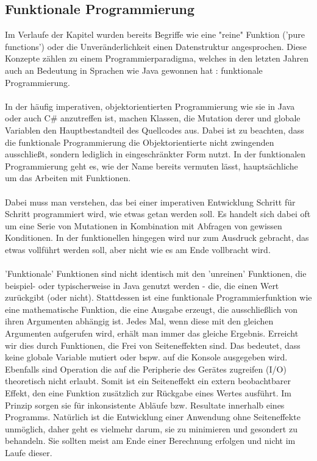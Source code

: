 \subsection{Funktionale Programmierung}
Im Verlaufe der Kapitel wurden bereits Begriffe wie eine "reine" Funktion ('pure functions') oder die Unveränderlichkeit einen Datenstruktur angesprochen. Diese Konzepte zählen zu einem Programmierparadigma, welches in den letzten Jahren auch an Bedeutung in Sprachen wie Java gewonnen hat
\cite{javaFunctionalProgramming}
: funktionale Programmierung.
\\\\
In der häufig imperativen, objektorientierten Programmierung wie sie in Java oder auch C\# anzutreffen ist, machen Klassen, die Mutation derer und globale Variablen den Hauptbestandteil des Quellcodes aus. Dabei ist zu beachten, dass die funktionale Programmierung die Objektorientierte nicht zwingenden ausschließt, sondern lediglich in eingeschränkter Form nutzt. In der funktionalen Programmierung geht es, wie der Name bereits vermuten lässt, hauptsächliche um das Arbeiten mit Funktionen.
\\\\ 
Dabei muss man verstehen, das bei einer imperativen Entwicklung Schritt für Schritt programmiert wird, wie etwas getan werden soll. Es handelt sich dabei oft um eine Serie von Mutationen in Kombination mit Abfragen von gewissen Konditionen. In der funktionellen hingegen wird nur zum Ausdruck gebracht, das etwas vollführt werden soll, aber nicht wie es am Ende vollbracht wird. 
\\\\
'Funktionale' Funktionen sind nicht identisch mit den 'unreinen' Funktionen, die beispiel- oder typischerweise in Java genutzt werden - die, die einen Wert zurückgibt (oder nicht). Stattdessen ist eine funktionale Programmierfunktion wie eine mathematische Funktion, die eine Ausgabe erzeugt, die ausschließlich von ihren Argumenten abhängig ist. Jedes Mal, wenn diese mit den gleichen Argumenten aufgerufen wird, erhält man immer das gleiche Ergebnis. Erreicht wir dies durch Funktionen, die Frei von Seiteneffekten sind. Das bedeutet, dass keine globale Variable mutiert oder bspw. auf die Konsole ausgegeben wird. Ebenfalls sind Operation die auf die Peripherie des Gerätes zugreifen (I/O) theoretisch nicht erlaubt. Somit ist ein  Seiteneffekt ein extern beobachtbarer Effekt, den eine Funktion zusätzlich zur Rückgabe eines Wertes ausführt. Im Prinzip sorgen sie für inkonsistente Abläufe bzw. Resultate innerhalb eines Programms. Natürlich ist die Entwicklung einer Anwendung ohne Seiteneffekte unmöglich, daher geht es vielmehr darum, sie zu minimieren und gesondert zu behandeln. Sie sollten meist am Ende einer Berechnung erfolgen und nicht im Laufe dieser.
